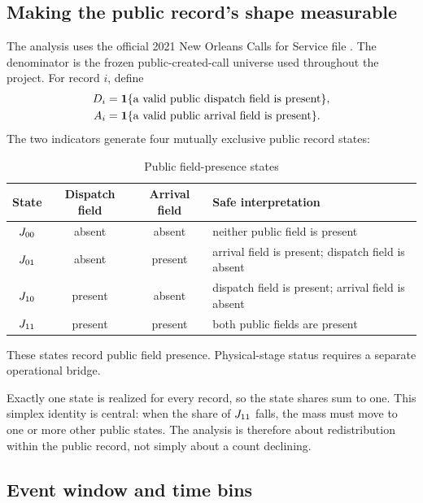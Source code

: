 \documentclass[11pt]{article}
\begin{document}
\subsection{Making the public record's shape measurable}

The analysis uses the official 2021 New Orleans Calls for Service file \citep{DataNOLA2021}. The denominator is the frozen public-created-call universe used throughout the project. For record $i$, define
\begin{align}
D_i&=\mathbf{1}\{\text{a valid public dispatch field is present}\},\\
A_i&=\mathbf{1}\{\text{a valid public arrival field is present}\}.
\label{eq:DA}
\end{align}
The two indicators generate four mutually exclusive public record states:

\begin{table}[t]
\centering
\caption{Public field-presence states}
\label{tab:states}
\begin{tabularx}{\textwidth}{@{}c cc X@{}}
\toprule
State & Dispatch field & Arrival field & Safe interpretation \\
\midrule
$J_{00}$ & absent & absent & neither public field is present \\
$J_{01}$ & absent & present & arrival field is present; dispatch field is absent \\
$J_{10}$ & present & absent & dispatch field is present; arrival field is absent \\
$J_{11}$ & present & present & both public fields are present \\
\bottomrule
\end{tabularx}
\begin{minipage}{0.96\textwidth}\footnotesize
These states record public field presence. Physical-stage status requires a separate operational bridge.
\end{minipage}
\end{table}

Exactly one state is realized for every record, so the state shares sum to one. This simplex identity is central: when the share of $J_{11}$ falls, the mass must move to one or more other public states. The analysis is therefore about redistribution within the public record, not simply about a count declining.

\subsection{Event window and time bins}
\end{document}
